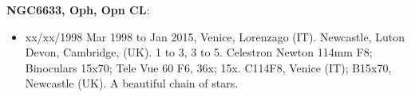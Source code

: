 {\bf NGC6633, Oph, Opn CL}:
\begin{itemize}
\item xx/xx/1998 Mar 1998 to Jan 2015, Venice, Lorenzago (IT). Newcastle, Luton Devon, Cambridge, (UK). 1 to 3, 3 to 5. Celestron Newton 114mm F8; Binoculars 15x70; Tele Vue 60 F6, 36x; 15x. C114F8, Venice (IT); B15x70, Newcastle (UK). A beautiful chain of stars.
\end{itemize}
